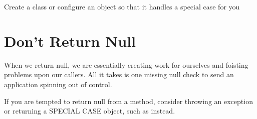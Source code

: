 \begin{marker}
Create a class or configure an object so that it handles a special case for you
\end{marker}

\section{Don't Return Null}

When we return null, we are essentially creating work for ourselves and foisting
problems upon our callers. All it takes is one missing null check to send an application spinning out of control.

\begin{marker}
If you are tempted to return null from a method, consider throwing an exception or returning a SPECIAL CASE object, such as  instead.
\end{marker}
